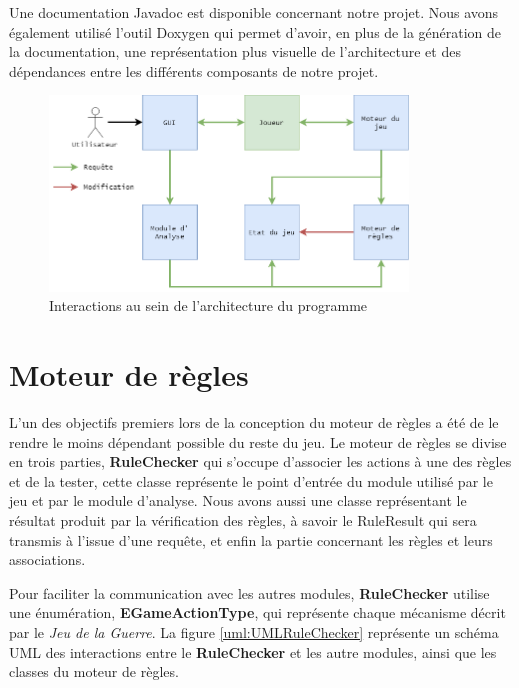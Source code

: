 \documentclass[a4paper]{report}
\begin{document}
Une documentation Javadoc est disponible concernant notre projet. Nous avons également utilisé l'outil Doxygen qui permet d'avoir, en plus de la génération de la documentation, une représentation plus visuelle de l'architecture et des dépendances entre les différents composants de notre projet.

\begin{figure}[!h]
\centering
\includegraphics[width=0.85\textwidth]{UML/modules}
\caption{Interactions au sein de l'architecture du programme}\label{fig:ex4modules}
\end{figure}


\section{Moteur de règles} 
\label{sec:moteurDeRègles}
L'un des objectifs premiers lors de la conception du moteur de règles a été de le rendre le moins dépendant possible du reste du jeu. Le moteur de règles se divise en trois parties, \textbf{RuleChecker} qui s'occupe d'associer les actions à une des règles et de la tester, cette classe représente le point d'entrée du module utilisé par le jeu et par le module d'analyse. Nous avons aussi une classe représentant le résultat produit par la vérification des règles, à savoir le RuleResult qui sera transmis à l'issue d'une requête, et enfin la partie concernant les règles et leurs associations.

Pour faciliter la communication avec les autres modules, \textbf{RuleChecker} utilise une énumération, \textbf{EGameActionType}, qui représente chaque mécanisme décrit par le \textit{Jeu de la Guerre}.
La figure \ref{uml:UMLRuleChecker} représente un schéma UML des interactions entre le \textbf{RuleChecker} et les autre modules, ainsi que les classes du moteur de règles.
\end{document}
